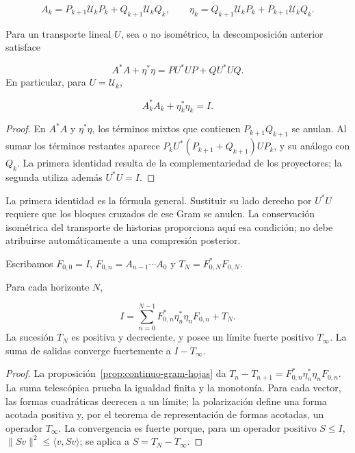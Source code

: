 \[
A_k=P_{k+1}\mathcal U_kP_k+Q_{k+1}\mathcal U_kQ_k,
\qquad
\eta_k=Q_{k+1}\mathcal U_kP_k+P_{k+1}\mathcal U_kQ_k.
\]
\begin{proposition}
\label{prop:continuo-gram-hojas}
Para un transporte lineal \(U\), sea o no isométrico, la descomposición anterior satisface

\[
A^*A+\eta^*\eta=PU^*UP+QU^*UQ.
\]
En particular, para \(U=\mathcal U_k\),

\[
A_k^*A_k+\eta_k^*\eta_k=I.
\]
\end{proposition}
\begin{proof}
En \(A^*A\) y \(\eta^*\eta\), los términos mixtos que contienen \(P_{k+1}Q_{k+1}\) se anulan. Al sumar los términos restantes aparece \(P_kU^*(P_{k+1}+Q_{k+1})UP_k\), y su análogo con \(Q_k\). La primera identidad resulta de la complementariedad de los proyectores; la segunda utiliza además \(U^*U=I\).
\end{proof}

La primera identidad es la fórmula general. Sustituir su lado derecho por \(U^*U\) requiere que los bloques cruzados de ese Gram se anulen. La conservación isométrica del transporte de historias proporciona aquí esa condición; no debe atribuirse automáticamente a una compresión posterior.

Escribamos \(F_{0,0}=I\), \(F_{0,n}=A_{n-1}\cdots A_0\) y \(T_N=F_{0,N}^*F_{0,N}\).

\begin{theorem}
\label{thm:continuo-descomposicion-terminal}
Para cada horizonte \(N\),

\[
I=\sum_{n=0}^{N-1}
F_{0,n}^*\eta_n^*\eta_nF_{0,n}+T_N.
\]
La sucesión \(T_N\) es positiva y decreciente, y posee un límite fuerte positivo \(T_\infty\). La suma de salidas converge fuertemente a \(I-T_\infty\).
\end{theorem}
\begin{proof}
La proposición~\ref{prop:continuo-gram-hojas} da \(T_n-T_{n+1}=F_{0,n}^*\eta_n^*\eta_nF_{0,n}\). La suma telescópica prueba la igualdad finita y la monotonía. Para cada vector, las formas cuadráticas decrecen a un límite; la polarización define una forma acotada positiva y, por el teorema de representación de formas acotadas, un operador \(T_\infty\). La convergencia es fuerte porque, para un operador positivo \(S\leq I\), \(\|Sv\|^2\leq\langle v,Sv\rangle\); se aplica a \(S=T_N-T_\infty\).
\end{proof}

